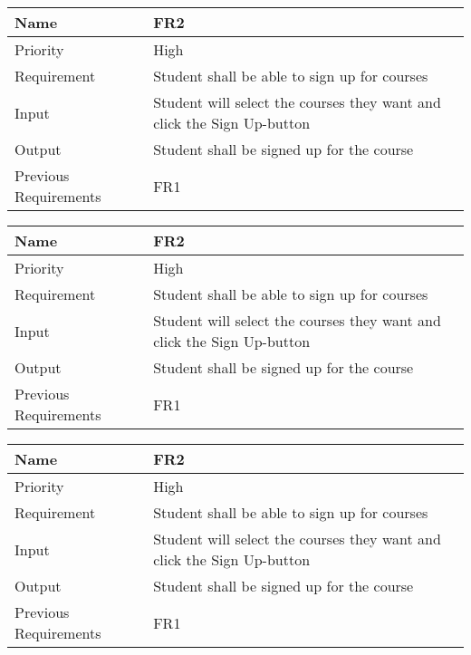 \begin{tabularx}{\textwidth}{|l|X|}
  \hline
  Name & FR2 \\ \hline
  Priority & High \\ \hline
  Requirement & Student shall be able to sign up for courses \\ \hline
  Input & Student will select the courses they want and click the Sign Up-button \\ \hline
  Output & Student shall be signed up for the course \\ \hline
  Previous Requirements & FR1 \\ \hline
\end{tabularx}

\begin{tabularx}{\textwidth}{|l|X|}
  \hline
  Name & FR2 \\ \hline
  Priority & High \\ \hline
  Requirement & Student shall be able to sign up for courses \\ \hline
  Input & Student will select the courses they want and click the Sign Up-button \\ \hline
  Output & Student shall be signed up for the course \\ \hline
  Previous Requirements & FR1 \\ \hline
\end{tabularx}

\begin{tabularx}{\textwidth}{|l|X|}
  \hline
  Name & FR2 \\ \hline
  Priority & High \\ \hline
  Requirement & Student shall be able to sign up for courses \\ \hline
  Input & Student will select the courses they want and click the Sign Up-button \\ \hline
  Output & Student shall be signed up for the course \\ \hline
  Previous Requirements & FR1 \\ \hline
\end{tabularx}